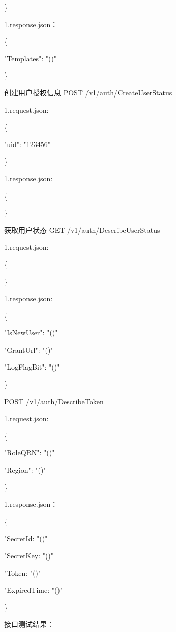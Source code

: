 \}

1.response.json：

\{

"Templates": "\@exists()"

\}

创建用户授权信息
POST /v1/auth/CreateUserStatus

1.request.json:

\{

"uid": "123456"

\}

1.response.json:

\{

\}

获取用户状态
GET /v1/auth/DescribeUserStatus

1.request.json:

\{

\}

1.response.json:

\{

"IsNewUser": "\@exists()"

"GrantUrl": "\@exists()"

"LogFlagBit": "\@exists()"

\}

POST /v1/auth/DescribeToken

1.request.json:

\{

"RoleQRN": "\@notEmpty()"

"Region": "\@notEmpty()"

\}

1.response.json：

\{

"SecretId: "\@notEmpty()"

"SecretKey: "\@notEmpty()"

"Token: "\@exists()"

"ExpiredTime: "\@exists()"

\}


接口测试结果：

